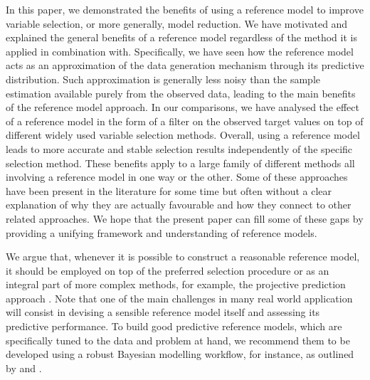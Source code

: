 \documentclass[a4]{article}
\theoremstyle{definition}
\begin{document}
In this paper, we demonstrated the benefits of using a reference model
to improve variable selection, or more generally, model reduction. 
We have motivated and explained the general benefits
of a reference model regardless of the method it is applied in combination
with. Specifically, we have seen how the reference model acts as an
approximation of the data generation mechanism through its predictive
distribution. Such approximation is generally less noisy than the
sample estimation available purely from the observed data, leading to
the main benefits of the reference model approach. In our comparisons,
we have analysed the effect of a reference model in the form of a
filter on the observed target values on top of different widely used
variable selection methods. Overall, using a reference model leads to
more accurate and stable selection results independently of the
specific selection method. These benefits apply to a large family of
different methods all involving a reference model in one way or the
other. Some of these approaches have been present in the literature for some time
\cite[e.g., see references in][]{vehtari2012survey,paper:projpred}
but often without a clear explanation of {why} they are actually
favourable and how they connect to other related approaches. We hope
that the present paper can fill some of these gaps by providing a
unifying framework and understanding of reference models.

We argue that, whenever it is possible to construct a reasonable
reference model, it should be employed on top of the preferred
selection procedure or as an integral part of more complex methods,
for example, the projective prediction approach
\citep{paper:projpred}. Note that one of the main challenges in many
real world application will consist in devising a sensible reference
model itself and assessing its predictive performance.
To build good predictive reference models, which are specifically
tuned to the data and problem at hand, we recommend them to be
developed using a robust Bayesian modelling workflow, for instance, as
outlined by \citet{gelman2013bayesian} and \citet{gabry2019visualization}.
\end{document}
